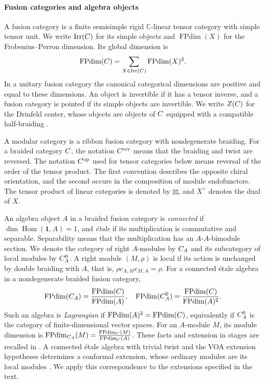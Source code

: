\documentclass[leqno]{article}
\newcommand{\Cbb}{\ensuremath{\mathbb{C}}}
\let\cal\relax
\newcommand{\cal}{\mathcal}
\DeclareMathOperator{\Irr}{Irr}
\numberwithin{equation}{section}
\begin{document}
\paragraph{Fusion categories and algebra objects}
A fusion category is a finite semisimple rigid $\Cbb$-linear tensor category with simple tensor unit. We write $\Irr(\cal C)$ for its simple objects and $\operatorname{FPdim}(X)$ for the Frobenius--Perron dimension. Its global dimension is
\[
\operatorname{FPdim}(\cal C) = \sum_{X \in \Irr(\cal C)}\operatorname{FPdim}(X)^2.
\]
In a unitary fusion category the canonical categorical dimensions are positive and equal to these dimensions. An object is invertible if it has a tensor inverse, and a fusion category is pointed if its simple objects are invertible. We write $Z(\cal C)$ for the Drinfeld center, whose objects are objects of $\cal C$ equipped with a compatible half-braiding \cite{EGNO15}.

A modular category is a ribbon fusion category with nondegenerate braiding. For a braided category $\cal C$, the notation $\cal C^{\mathrm{rev}}$ means that the braiding and twist are reversed. The notation $\cal C^{\mathrm{op}}$ used for tensor categories below means reversal of the order of the tensor product. The first convention describes the opposite chiral orientation, and the second occurs in the composition of module endofunctors. The tensor product of linear categories is denoted by $\boxtimes$, and $X^\vee$ denotes the dual of $X$.

An algebra object $A$ in a braided fusion category is \emph{connected} if $\dim\operatorname{Hom}(\mathbf1,A) = 1$, and \emph{\'etale} if its multiplication is commutative and separable. Separability means that the multiplication has an $A$-$A$-bimodule section. We denote the category of right $A$-modules by $\cal C_A$ and its subcategory of local modules by $\cal C_A^0$. A right module $(M,\rho)$ is local if its action is unchanged by double braiding with $A$, that is, $\rho c_{A,M}c_{M,A} = \rho$. For a connected \'etale algebra in a nondegenerate braided fusion category,
\[
\operatorname{FPdim}(\cal C_A) = \frac{\operatorname{FPdim}(\cal C)}{\operatorname{FPdim}(A)},
\quad
\operatorname{FPdim}(\cal C_A^0) = \frac{\operatorname{FPdim}(\cal C)}{\operatorname{FPdim}(A)^2}.
\]
Such an algebra is \emph{Lagrangian} if $\operatorname{FPdim}(A)^2 = \operatorname{FPdim}(\cal C)$, equivalently if $\cal C_A^0$ is the category of finite-dimensional vector spaces. For an $A$-module $M$, its module dimension is $\operatorname{FPdim}_{\cal C_A}(M) = \frac{\operatorname{FPdim}_{\cal C}(M)}{\operatorname{FPdim}_{\cal C}(A)}$. These facts and extension in stages are recalled in \cite[Sections 3 and 3.6]{DMNO13}. A connected \'etale algebra with trivial twist and the VOA extension hypotheses determines a conformal extension, whose ordinary modules are its local modules \cite{HKL15}. We apply this correspondence to the extensions specified in the text.
\end{document}
